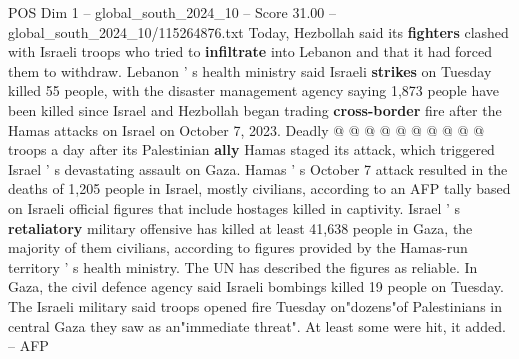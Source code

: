 \begin{textsample}{POS Dim 1 – global\_south\_2024\_10 – Score 31.00 – global\_south\_2024\_10/115264876.txt}
Today, Hezbollah said its \textbf{fighters} clashed with Israeli troops who tried to \textbf{infiltrate} into Lebanon and that it had forced them to withdraw.
Lebanon ' s health ministry said Israeli \textbf{strikes} on Tuesday killed 55 people, with the disaster management agency saying 1,873 people have been killed since Israel and Hezbollah began trading \textbf{cross-border} fire after the Hamas attacks on Israel on October 7, 2023.
Deadly @ @ @ @ @ @ @ @ @ @ troops a day after its Palestinian \textbf{ally} Hamas staged its attack, which triggered Israel ' s devastating assault on Gaza.
Hamas ' s October 7 attack resulted in the deaths of 1,205 people in Israel, mostly civilians, according to an AFP tally based on Israeli official figures that include hostages killed in captivity.
Israel ' s \textbf{retaliatory} military offensive has killed at least 41,638 people in Gaza, the majority of them civilians, according to figures provided by the Hamas-run territory ' s health ministry.
The UN has described the figures as reliable.
In Gaza, the civil defence agency said Israeli bombings killed 19 people on Tuesday.
The Israeli military said troops opened fire Tuesday on"dozens"of Palestinians in central Gaza they saw as an"immediate threat".
At least some were hit, it added. -- AFP

\end{textsample}
